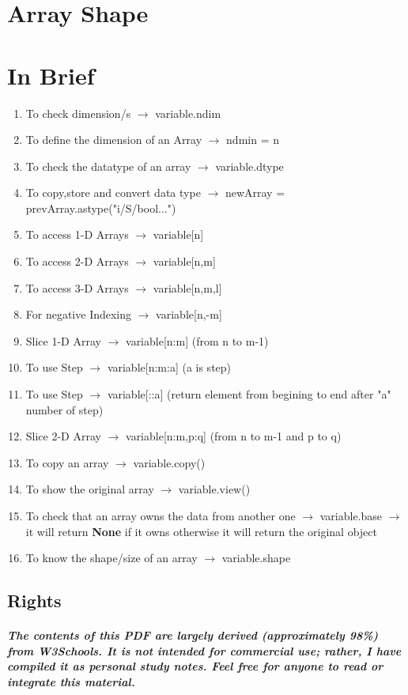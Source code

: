 \documentclass[openany]{book}
\begin{document}
\chapter{Array Shape}

\chapter{In Brief}

\begin{enumerate}
    \item To check dimension/s $\rightarrow$ variable.ndim 
    \item To define the dimension of an Array $\rightarrow$ ndmin = n 
    \item To check the datatype of an array $\rightarrow$ variable.dtype
    \item To copy,store and convert data type $\rightarrow$ newArray = prevArray.astype("i/S/bool...")
    \item To access 1-D Arrays $\rightarrow$ variable[n]
    \item To access 2-D Arrays $\rightarrow$ variable[n,m]
    \item To access 3-D Arrays $\rightarrow$ variable[n,m,l]
    \item For negative Indexing $\rightarrow$ variable[n,-m]
    \item Slice 1-D Array $\rightarrow$ variable[n:m] (from n to m-1)
    \item To use Step $\rightarrow$ variable[n:m:a] (a is step)
    \item To use Step $\rightarrow$ variable[::a] (return element from begining to end after "a" number of step)
    \item Slice 2-D Array $\rightarrow$ variable[n:m,p:q] (from n to m-1 and p to q)
    \item To copy an array $\rightarrow$ variable.copy()
    \item To show the original array $\rightarrow$ variable.view()
    \item To check that an array owns the data from another one $\rightarrow$ variable.base $\rightarrow$ it will return \textbf{None} if it owns otherwise it will return the original object
    \item To know the shape/size of an array $\rightarrow$ variable.shape
\end{enumerate}
\newpage

\section{Rights}

\paragraph{The contents of this PDF are largely derived (approximately 98\%) from W3Schools. It is not intended for commercial use; rather, I have compiled it as personal study notes. Feel free for anyone to read or integrate this material.}

\cleardoublepage
\end{document}
